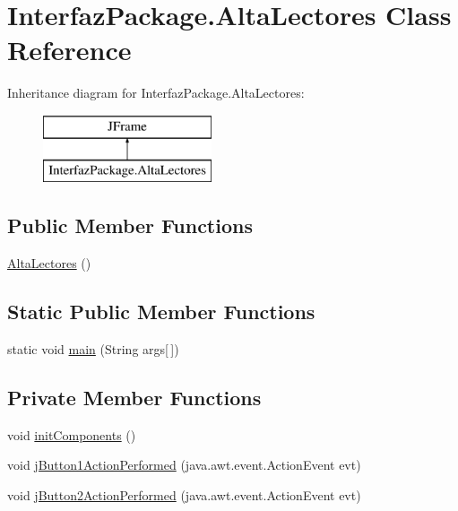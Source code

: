 \hypertarget{class_interfaz_package_1_1_alta_lectores}{}\section{Interfaz\+Package.\+Alta\+Lectores Class Reference}
\label{class_interfaz_package_1_1_alta_lectores}
Inheritance diagram for Interfaz\+Package.\+Alta\+Lectores\+:\begin{figure}[H]
\begin{center}
\leavevmode
\includegraphics[height=2.000000cm]{class_interfaz_package_1_1_alta_lectores}
\end{center}
\end{figure}
\subsection*{Public Member Functions}
\begin{DoxyCompactItemize}
\item 
\mbox{\hyperlink{class_interfaz_package_1_1_alta_lectores_a3cec38f19ea0fbf8c48d9af5911441de}{Alta\+Lectores}} ()
\end{DoxyCompactItemize}
\subsection*{Static Public Member Functions}
\begin{DoxyCompactItemize}
\item 
static void \mbox{\hyperlink{class_interfaz_package_1_1_alta_lectores_a26397a39d8852d63d6e04a40db326308}{main}} (String args\mbox{[}$\,$\mbox{]})
\end{DoxyCompactItemize}
\subsection*{Private Member Functions}
\begin{DoxyCompactItemize}
\item 
void \mbox{\hyperlink{class_interfaz_package_1_1_alta_lectores_a5322210114e54c48c48a09b645628a06}{init\+Components}} ()
\item 
void \mbox{\hyperlink{class_interfaz_package_1_1_alta_lectores_af6d6d0a98b0748f84e8cf4bf8ef3d153}{j\+Button1\+Action\+Performed}} (java.\+awt.\+event.\+Action\+Event evt)
\item 
void \mbox{\hyperlink{class_interfaz_package_1_1_alta_lectores_a15e953f7a9cd8a7448fdac22f39f55aa}{j\+Button2\+Action\+Performed}} (java.\+awt.\+event.\+Action\+Event evt)
\end{DoxyCompactItemize}
